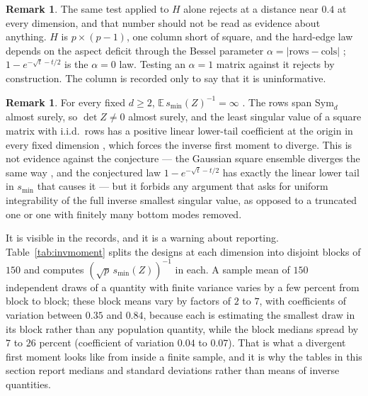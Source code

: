 \documentclass[11pt]{article}
\theoremstyle{definition}
\newtheorem{remark}[theorem]{Remark}
\newcommand{\E}{\mathbb{E}}
\newcommand{\numInvMeanCvMax}{0.84}
\newcommand{\numInvMeanCvMin}{0.35}
\newcommand{\numInvMeanSpreadMax}{7}
\newcommand{\numInvMeanSpreadMin}{2}
\newcommand{\numInvMedCvMax}{0.07}
\newcommand{\numInvMedCvMin}{0.04}
\newcommand{\numInvMedSpreadMax}{26}
\newcommand{\numInvMedSpreadMin}{7}
\begin{document}
\begin{remark}
The same test applied to $H$ alone rejects at a distance near $0.4$ at every dimension, and that
number should not be read as evidence about anything. $H$ is $p\times(p-1)$, one column short of
square, and the hard-edge law depends on the aspect deficit through the Bessel parameter
$\alpha=|\text{rows}-\text{cols}|$ \cite{TracyWidom}; $1-e^{-\sqrt t-t/2}$ is the $\alpha=0$ law.
Testing an $\alpha=1$ matrix against it rejects by construction. The column is recorded only to say
that it is uninformative.
\end{remark}

\begin{remark}
For every fixed $d\ge2$, $\E\,s_{\min}(Z)^{-1}=\infty$ \cite{PN24}. The rows span $\mathrm{Sym}_d$
almost surely, so $\det Z\ne0$ almost surely, and the least singular value of a square matrix with
i.i.d.\ rows has a positive linear lower-tail coefficient at the origin in every fixed dimension
\cite{GregorattiMaran}, which forces the inverse first moment to diverge. This is not evidence
against the conjecture --- the Gaussian square ensemble diverges the same way \cite{Edelman}, and the
conjectured law $1-e^{-\sqrt t-t/2}$ has exactly the linear lower tail in $s_{\min}$ that causes it
--- but it forbids any argument that asks for uniform integrability of the full inverse smallest
singular value, as opposed to a truncated one or one with finitely many bottom modes removed.

It is visible in the records, and it is a warning about reporting. Table~\ref{tab:invmoment} splits
the designs at each dimension into disjoint blocks of $150$ and computes $(\sqrt p\,s_{\min}(Z))^{-1}$
in each. A sample mean of $150$ independent draws of a quantity with finite variance varies by a few
percent from block to block; these block means vary by factors of $\numInvMeanSpreadMin$ to
$\numInvMeanSpreadMax$, with coefficients of variation between $\numInvMeanCvMin$ and
$\numInvMeanCvMax$, because each is estimating the smallest draw in its block rather than any
population quantity, while the block medians spread by $\numInvMedSpreadMin$ to
$\numInvMedSpreadMax$ percent (coefficient of variation $\numInvMedCvMin$ to $\numInvMedCvMax$). That
is what a
divergent first moment looks like from inside a finite sample, and it is why the tables in this
section report medians and standard deviations rather than means of inverse quantities.
\end{remark}
\end{document}
